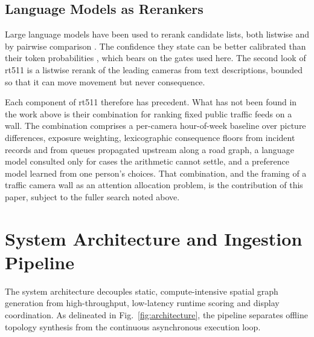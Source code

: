\documentclass[10pt,journal,compsoc]{IEEEtran}
\begin{document}
\subsection{Language Models as Rerankers}
Large language models have been used to rerank candidate lists, both listwise \cite{sun2023} and by pairwise comparison \cite{qin2024}. The confidence they state can be better calibrated than their token probabilities \cite{tian2023}, which bears on the gates used here. The second look of rt511 is a listwise rerank of the leading cameras from text descriptions, bounded so that it can move movement but never consequence.

Each component of rt511 therefore has precedent. What has not been found in the work above is their combination for ranking fixed public traffic feeds on a wall. The combination comprises a per-camera hour-of-week baseline over picture differences, exposure weighting, lexicographic consequence floors from incident records and from queues propagated upstream along a road graph, a language model consulted only for cases the arithmetic cannot settle, and a preference model learned from one person's choices. That combination, and the framing of a traffic camera wall as an attention allocation problem, is the contribution of this paper, subject to the fuller search noted above.

\section{System Architecture and Ingestion Pipeline}
The system architecture decouples static, compute-intensive spatial graph generation from high-throughput, low-latency runtime scoring and display coordination. As delineated in Fig.~\ref{fig:architecture}, the pipeline separates offline topology synthesis from the continuous asynchronous execution loop.
\end{document}
